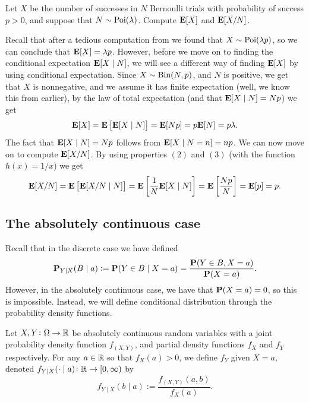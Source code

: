 \documentclass[11pt,a4paper]{article}
\begin{document}
\begin{exercise}
  Let $X$ be the number of successes in $N$ Bernoulli trials
  with probability of success $p > 0$,
  and suppose that $N \sim \operatorname{Poi}(\lambda)$.
  Compute $\mathbf{E}[X]$ and $\mathbf{E}[X / N]$.
\end{exercise}
\begin{solution}
  Recall that after a tedious computation 
  from 
  we found that $X \sim \operatorname{Poi}(\lambda p)$,
  so we can conclude that $\mathbf{E}[X] = \lambda p$.
  However, before we move on to finding the conditional expectation
  $\mathbf{E}[X \mid N]$,
  we will see a different way of finding $\mathbf{E}[X]$
  by using conditional expectation.
  Since $X \sim \operatorname{Bin}(N,p)$,
  and $N$ is positive,
  we get that $X$ is nonnegative, and we assume it has finite expectation
  (well, we know this from earlier),
  by the law of total expectation (and that $\mathbf{E}[X \mid N] = N p$) we get
  \[
    \mathbf{E}[X] = \mathbf{E}\left[\mathbf{E}[X \mid N]\right] = \mathbf{E}[N p] = p\mathbf{E}[N] = p\lambda.
  \]
  The fact that $\mathbf{E}[X \mid N] = N p$ follows from
  $\mathbf{E}[X \mid N = n] = n p$.
  We can now move on to compute $\mathbf{E}[X / N]$.
  By using properties $(2)$ and $(3)$ (with the function $h(x) = 1/x$)
  we get
  \[
    \mathbf{E}[X / N] =
    \mathbf{E}\left[\mathbf{E}[X / N \mid N]\right] =
    \mathbf{E}\left[\frac 1N \mathbf{E}[X \mid N]\right] =
    \mathbf{E}\left[\frac{N p}{N} \right] =
    \mathbf{E}[p] = p.
  \]
\end{solution}

\subsection{The absolutely continuous case}
Recall that in the discrete case we have defined
\[
  \mathbf{P}_{Y \mid X}(B \mid a) :=
  \mathbf{P}(Y \in B \mid X = a) =
  \frac{\mathbf{P}(Y \in B, X = a)}{\mathbf{P}(X = a)}.
\]
However, in the absolutely continuous case,
we have that $\mathbf{P}(X = a) = 0$,
so this is impossible.
Instead, we will define conditional distribution through the probability
density functions.

\begin{definition}
  Let $X,Y \colon \Omega \to \mathbb{R}$ be absolutely continuous random variables with
  a joint probability density function $f_{(X,Y)}$,
  and partial density functions $f_X$ and $f_Y$ respectively.
  For any $a \in \mathbb{R}$ so that $f_X(a) > 0$,
  we define $f_Y$ given $X = a$,
  denoted $f_{Y \mid X}(\cdot \mid a) \colon \mathbb{R} \to [0,\infty)$ by
  \[
    f_{Y \mid X}(b \mid a) :=
    \frac{f_{(X,Y)}(a,b)}{f_X(a)}.
  \]
\end{definition}
\end{document}
